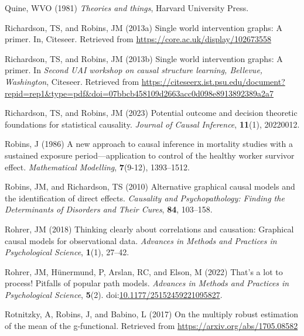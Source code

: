\documentclass[
  single column]{article}
\newlength{\cslhangindent}
\newenvironment{CSLReferences}[2] %
 {\begin{list}{}{%
  \setlength{\itemindent}{0pt}
  \setlength{\leftmargin}{0pt}
  \setlength{\parsep}{0pt}
  \ifodd #1
   \setlength{\leftmargin}{\cslhangindent}
   \setlength{\itemindent}{-1\cslhangindent}
  \fi
  \setlength{\itemsep}{#2\baselineskip}}}
 {\end{list}}
\begin{document}
\begin{CSLReferences}{1}{0}
Quine, WVO (1981) \emph{Theories and things}, Harvard University Press.

Richardson, TS, and Robins, JM (2013a) Single world intervention graphs:
A primer. In, Citeseer. Retrieved from
\url{https://core.ac.uk/display/102673558}

Richardson, TS, and Robins, JM (2013b) Single world intervention graphs:
A primer. In \emph{Second UAI workshop on causal structure learning,
{B}ellevue, {W}ashington}, Citeseer. Retrieved from
\url{https://citeseerx.ist.psu.edu/document?repid=rep1&type=pdf&doi=07bbcb458109d2663acc0d098e8913892389a2a7}

Richardson, TS, and Robins, JM (2023) Potential outcome and decision
theoretic foundations for statistical causality. \emph{Journal of Causal
Inference}, \textbf{11}(1), 20220012.

Robins, J (1986) A new approach to causal inference in mortality studies
with a sustained exposure period---application to control of the healthy
worker survivor effect. \emph{Mathematical Modelling}, \textbf{7}(9-12),
1393--1512.

Robins, JM, and Richardson, TS (2010) Alternative graphical causal
models and the identification of direct effects. \emph{Causality and
Psychopathology: Finding the Determinants of Disorders and Their Cures},
\textbf{84}, 103--158.

Rohrer, JM (2018) Thinking clearly about correlations and causation:
Graphical causal models for observational data. \emph{Advances in
Methods and Practices in Psychological Science}, \textbf{1}(1), 27--42.

Rohrer, JM, Hünermund, P, Arslan, RC, and Elson, M (2022) That's a lot
to process! Pitfalls of popular path models. \emph{Advances in Methods
and Practices in Psychological Science}, \textbf{5}(2).
doi:\href{https://doi.org/10.1177/25152459221095827}{10.1177/25152459221095827}.

Rotnitzky, A, Robins, J, and Babino, L (2017) On the multiply robust
estimation of the mean of the g-functional. Retrieved from
\url{https://arxiv.org/abs/1705.08582}


\end{CSLReferences}
\end{document}
